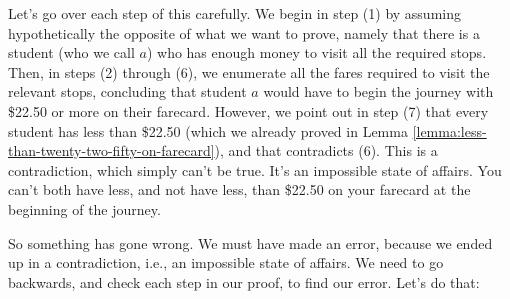 \documentclass[../../../main.tex]{subfiles}
\begin{document}
Let's go over each step of this carefully. We begin in step (1) by assuming hypothetically the opposite of what we want to prove, namely that there is a student (who we call $a$) who has enough money to visit all the required stops. Then, in steps (2) through (6), we enumerate all the fares required to visit the relevant stops, concluding that student $a$ would have to begin the journey with \$22.50 or more on their farecard. However, we point out in step (7) that every student has less than \$22.50 (which we already proved in Lemma \ref{lemma:less-than-twenty-two-fifty-on-farecard}), and that contradicts (6). This is a contradiction, which simply can't be true. It's an impossible state of affairs. You can't both have less, and not have less, than \$22.50 on your farecard at the beginning of the journey.

So something has gone wrong. We must have made an error, because we ended up in a contradiction, i.e., an impossible state of affairs. We need to go backwards, and check each step in our proof, to find our error. Let's do that:
\end{document}
